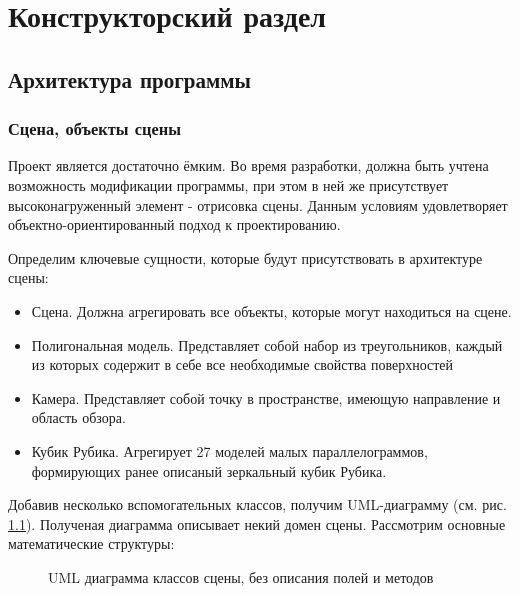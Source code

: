 \documentclass[a4paper, 14pt]{report} %
\begin{document}
	\chapter{Конструкторский раздел}
	\section{Архитектура программы}
	\subsection{Сцена, объекты сцены}
	Проект является достаточно ёмким. Во время разработки, должна быть учтена возможность модификации программы, при этом в ней же присутствует высоконагруженный элемент - отрисовка сцены. Данным условиям удовлетворяет объектно-ориентированный подход к проектированию.
	
	Определим ключевые сущности, которые будут присутствовать в архитектуре сцены:
	\begin{itemize}
		\item Сцена. Должна агрегировать все объекты, которые могут находиться на сцене.
		\item Полигональная модель. Представляет собой набор из треугольников, каждый из которых содержит в себе все необходимые свойства поверхностей
		\item Камера. Представляет собой точку в пространстве, имеющую направление и область обзора.
		\item Кубик Рубика. Агрегирует 27 моделей малых параллелограммов, формирующих ранее описаный зеркальный кубик Рубика.
	\end{itemize}

	Добавив несколько вспомогательных классов, получим UML-диаграмму (см. рис. \ref{uml_scene}). Полученая диаграмма описывает некий домен сцены. Рассмотрим основные математические структуры:
	\begin{figure}[ht]
		\caption{UML диаграмма классов сцены, без описания полей и методов}
		\label{uml_scene}
	\end{figure}
	
\end{document}
